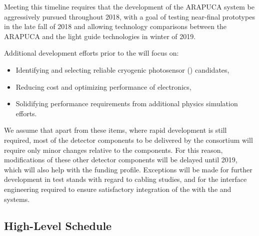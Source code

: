 Meeting this timeline requires that the development of the ARAPUCA system be aggressively pursued throughout 2018, with a goal of testing near-final prototypes in the late fall of 2018 and allowing technology comparisons between the ARAPUCA and the light guide technologies in winter of 2019.

Additional development efforts prior to the  will focus on:

\begin{itemize}
\item Identifying and selecting reliable cryogenic photosensor () candidates,
\item Reducing cost and optimizing performance of  electronics,
\item Solidifying  performance requirements from additional physics simulation efforts.
\end{itemize}

We assume that apart from these items, where rapid development is still required, most of the detector components to be delivered by the  consortium will require only minor changes relative to the  components. For this reason, modifications of these other detector components will be delayed until 2019, which will also help with the funding profile. Exceptions will be made for further development in test stands with regard to cabling studies, and for the interface engineering required to ensure satisfactory integration of the  with the  and   systems.


\subsection{High-Level Schedule}
\label{sec:fdsp-pd-org-cs}


